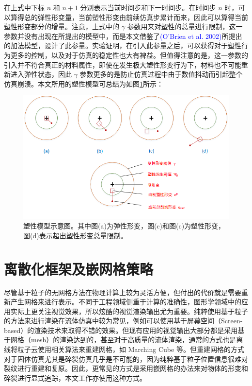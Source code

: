 在上式中下标 $n$ 和 $n + 1$ 分别表示当前时间步和下一时间步。在时间步 $n$ 时，可以算得总的弹性形变量，当前塑性形变由前续仿真步累计而来，因此可以算得当前塑性形变部分的增量。注意，上式中的 $\gamma$ 参数用来对塑性的总量进行限制，这一参数并没有出现在所提出的模型中，而是本文借鉴了\textcolor{blue}{(O'Brien et al. 2002)\parencite{OBrien2002}}所提出的加法模型，设计了此参量。实验证明，在引入此参量之后，可以获得对于塑性行为更多的控制，以及对于仿真的稳定性也大有裨益。但值得注意的是，这一参数的引入并不符合真正的材料属性，即使在发生极大塑性形变行为下，材料也不可能重新进入弹性状态，因此 $\gamma$ 参数更多的是防止仿真过程中由于数值抖动而引起整个仿真崩溃。本文所用的塑性模型可总结为如图\ref{plasticity_model}所示：

\begin{figure}[!htb]
  \centering
  \captionsetup{justification=centering}
  \includegraphics[width=\linewidth]{chap/image/plasticity_model}

  \caption{\label{plasticity_model}
           塑性模型示意图。其中图(a)为弹性形变，图(c)和图(c)为塑性形变，图(d)表示超出塑性形变总量限制。
          }
\end{figure}


\section{离散化框架及嵌网格策略}
\label{discretization}

尽管基于粒子的无网格方法在物理计算上较为灵活方便，但付出的代价就是需要重新产生网格来进行表示。不同于工程领域侧重于计算的准确性，图形学领域中的应用实际上更关注视觉效果，所以炫酷的视觉渲染输出尤为重要。纯粹使用基于粒子的方法来进行渲染在流体仿真中较为常见，例如可以使用基于屏幕空间（Screen-based）的渲染技术来取得不错的效果。但现有应用的视觉输出大部分都是采用基于网格（mesh）的渲染达到的，甚至对于高质量的流体渲染，通常的方式也是离线将粒子云使用相关算法来重建网格，如 Marching Cube 等。但重建网格的方式对于固体仿真尤其是碎裂仿真几乎是不可能的，因为纯粹基于粒子位置信息很难对裂纹进行重建和复原。因此，更常见的方式是采用嵌网格的办法来对物体的形变和碎裂进行显式追踪，本文工作亦使用这种方式。

